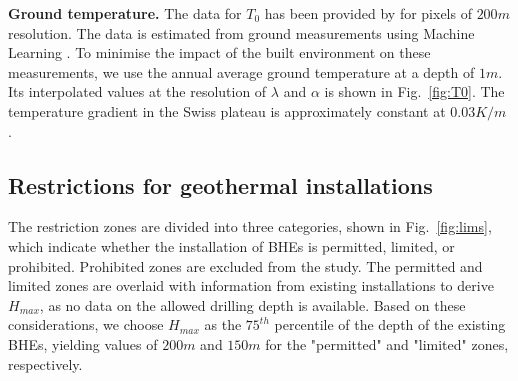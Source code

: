 \textbf{Ground temperature.}
The data for $T_0$ has been provided by \citet{assouline_machine_2019} for pixels of $200m$ resolution.
The data is estimated from ground measurements using Machine Learning \cite{assouline_machine_2019}.
To minimise the impact of the built environment on these measurements, we use the annual average ground temperature at a depth of $1m$.
Its interpolated values at the resolution of $\lambda$ and $\alpha$ is shown in Fig.~\ref{fig:T0}.
The temperature gradient in the Swiss plateau is approximately constant at $0.03K/m$ \cite{sia_sondes_2010}.

\subsection{Restrictions for geothermal installations}

The restriction zones are divided into three categories, shown in Fig.~\ref{fig:lims}, which indicate whether the installation of BHEs is permitted, limited, or prohibited.
Prohibited zones are excluded from the study. 
The permitted and limited zones are overlaid with information from existing installations to derive $H_{max}$, as no data on the allowed drilling depth is available.
Based on these considerations,
we choose $H_{max}$ as the $75^{th}$ percentile of the depth of the existing BHEs, yielding values of $200m$ and $150m$ for the "permitted" and "limited" zones, respectively. 
